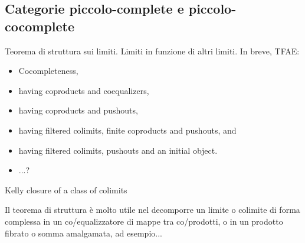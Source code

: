 \subsection{Categorie piccolo-complete e piccolo-cocomplete}
\Todo{}
\begin{theorem}
	Teorema di struttura sui limiti. Limiti in funzione di altri limiti. In breve, TFAE:
	\begin{itemize}
		\item 	Cocompleteness,
		\item having coproducts and coequalizers,
		\item having coproducts and pushouts,
		\item having filtered colimits, finite coproducts and pushouts, and
		\item having filtered colimits, pushouts and an initial object.
		\item ...?
	\end{itemize}
	Kelly closure of a class of colimits
\end{theorem}
Il teorema di struttura è molto utile nel decomporre un limite o colimite di forma complessa in un co/equalizzatore di mappe tra co/prodotti, o in un prodotto fibrato o somma amalgamata, ad esempio...
